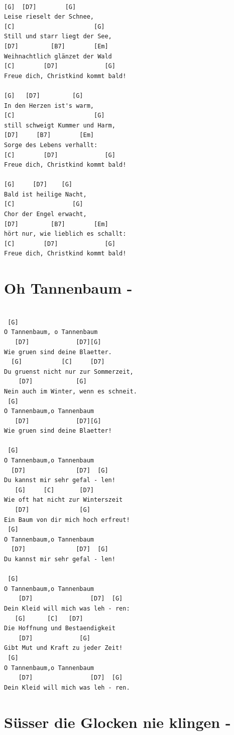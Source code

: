 \documentclass[]{book}
\let\stdsection\section
\renewcommand\section{\clearpage\stdsection}
\begin{document}
\begin{verbatim}

[G]  [D7]        [G]
Leise rieselt der Schnee,
[C]                      [G]
Still und starr liegt der See,
[D7]         [B7]        [Em]
Weihnachtlich glänzet der Wald
[C]        [D7]             [G]
Freue dich, Christkind kommt bald!

[G]   [D7]         [G]
In den Herzen ist's warm,
[C]                      [G]
still schweigt Kummer und Harm,
[D7]     [B7]        [Em]
Sorge des Lebens verhallt:
[C]        [D7]             [G]
Freue dich, Christkind kommt bald!

[G]     [D7]    [G]
Bald ist heilige Nacht,
[C]                [G]
Chor der Engel erwacht,
[D7]         [B7]        [Em]
hört nur, wie lieblich es schallt:
[C]        [D7]             [G]
Freue dich, Christkind kommt bald!
\end{verbatim}

\hypertarget{oh-tannenbaum--}{%
\section{Oh Tannenbaum -}\label{oh-tannenbaum--}}

\begin{verbatim}

 [G]          
O Tannenbaum, o Tannenbaum
   [D7]             [D7][G]      
Wie gruen sind deine Blaetter.
  [G]           [C]     [D7]     
Du gruenst nicht nur zur Sommerzeit,
    [D7]            [G]     
Nein auch im Winter, wenn es schneit.
 [G]      
O Tannenbaum,o Tannenbaum
   [D7]             [D7][G]     
Wie gruen sind deine Blaetter!
  
 [G]  
O Tannenbaum,o Tannenbaum 
  [D7]              [D7]  [G]      
Du kannst mir sehr gefal - len!
   [G]     [C]       [D7]       
Wie oft hat nicht zur Winterszeit
   [D7]              [G]     
Ein Baum von dir mich hoch erfreut!
 [G]  
O Tannenbaum,o Tannenbaum
  [D7]              [D7]  [G]     
Du kannst mir sehr gefal - len!

 [G]    
O Tannenbaum,o Tannenbaum
    [D7]                [D7]  [G]     
Dein Kleid will mich was leh - ren:
   [G]      [C]   [D7]  
Die Hoffnung und Bestaendigkeit
    [D7]             [G]  
Gibt Mut und Kraft zu jeder Zeit!
 [G]  
O Tannenbaum,o Tannenbaum
    [D7]                [D7]  [G]     
Dein Kleid will mich was leh - ren. 
\end{verbatim}

\hypertarget{susser-die-glocken-nie-klingen--}{%
\section{Süsser die Glocken nie klingen -}\label{susser-die-glocken-nie-klingen--}}
\end{document}
